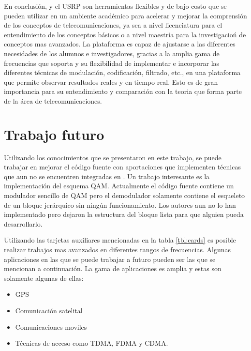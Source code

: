 En conclusi\'on, \gnuradio y el USRP son herramientas flexibles y de bajo costo que se pueden utilizar en un ambiente acad\'emico
para acelerar y mejorar la comprensi\'on de los conceptos de telecomunicaciones, ya sea a nivel licenciatura para el entendimiento
de los conceptos b\'asicos o a nivel maestr\'ia para la investigacio\'n de conceptos mas avanzados. La plataforma es capaz de
ajustarse a las diferentes necesidades de los alumnos e investigadores, gracias a la amplia gama de frecuencias que soporta y su
flexibilidad de implementar e incorporar las diferentes t\'ecnicas de modulaci\'on, codificaci\'on, filtrado, etc., en una
plataforma que permite observar resultados reales y en tiempo real. Esto es de gran importancia para su entendimiento y
comparaci\'on con la teoria que forma parte de la \'area de telecomunicaciones.

\section{Trabajo futuro}
Utilizando los conocimientos que se presentaron en este trabajo, se puede trabajar en mejorar el c\'odigo fuente con aportaciones
que implementen t\'ecnicas que aun no se encuentren integradas en \gnuradio. Un trabajo interesante es la implementaci\'on del
esquema QAM. Actualmente el c\'odigo fuente contiene un modulador sencillo de QAM pero el demodulador solamente contiene el
esqueleto de un bloque jer\'arquico sin ning\'un funcionamiento. Los autores aun no lo han implementado pero dejaron la estructura
del bloque lista para que alguien pueda desarrollarlo.

Utilizando las tarjetas auxiliares mencionadas en la tabla \ref{tbl:cards} es posible realizar trabajos mas avanzados en
diferentes rangos de frecuencias. Algunas aplicaciones en las que se puede trabajar a futuro pueden ser las que se mencionan a
continuaci\'on. La gama de aplicaciones es amplia y estas son solamente algunas de ellas:
\begin{itemize}
  \item GPS
  \item Comunicaci\'on satelital
  \item Comunicaciones moviles
  \item T\'ecnicas de acceso como TDMA, FDMA y CDMA.
\end{itemize}